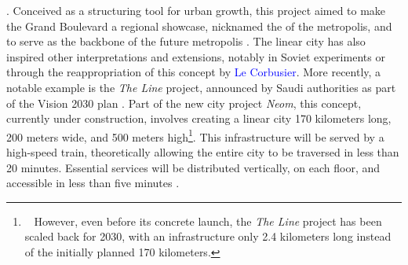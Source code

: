 \begin{refsegment}
{} \textcolor{blue}{\autocite[87]{demangeon_lille-roubaix-tourcoing_1988}}. Conceived as a structuring tool for urban growth, this project aimed to make the Grand Boulevard a regional showcase, nicknamed the  of the metropolis, and to serve as the backbone of the future metropolis \textcolor{blue}{\autocite{dubuis__2020}}. The linear city has also inspired other interpretations and extensions, notably in Soviet experiments or through the reappropriation of this concept by \textcolor{blue}{Le Corbusier}. More recently, a notable example is the \textsl{The Line} project, announced by Saudi authorities as part of the Vision 2030 plan \textcolor{blue}{\autocite[139]{arnault_ville_2022}}. Part of the new city project \textsl{Neom}, this concept, currently under construction, involves creating a linear city 170 kilometers long, 200 meters wide, and 500 meters high\footnote{~
    However, even before its concrete launch, the \textsl{The Line} project has been scaled back for 2030, with an infrastructure only 2.4 kilometers long instead of the initially planned 170 kilometers.
}. This infrastructure will be served by a high-speed train, theoretically allowing the entire city to be traversed in less than 20 minutes. Essential services will be distributed vertically, on each floor, and accessible in less than five minutes \textcolor{blue}{\autocite[139]{arnault_ville_2022}}.%


\end{refsegment}
